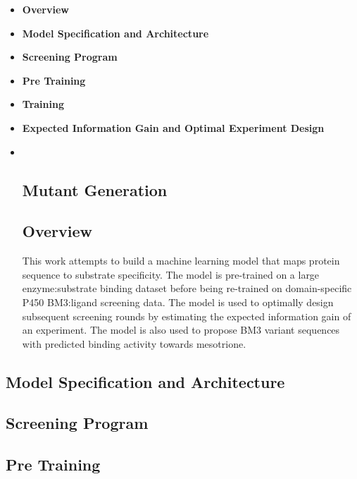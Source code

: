 \begin{itemize}
\item
  \textbf{Overview}
\item
  \textbf{Model Specification and Architecture}
\item
  \textbf{Screening Program}
\item
  \textbf{Pre Training}
\item
  \textbf{Training}
\item
  \textbf{Expected Information Gain and Optimal Experiment Design}
\item ~
  \hypertarget{mutant-generation}{%
  \subsection{\texorpdfstring{\textbf{Mutant
  Generation}}{Mutant Generation}}\label{mutant-generation}}

  \hypertarget{overview-9}{%
  \subsection{Overview}\label{overview-9}}

  This work attempts to build a machine learning model that maps protein
  sequence to substrate specificity. The model is pre-trained on a large
  enzyme:substrate binding dataset before being re-trained on
  domain-specific P450 BM3:ligand screening data. The model is used to
  optimally design subsequent screening rounds by estimating the
  expected information gain of an experiment. The model is also used to
  propose BM3 variant sequences with predicted binding activity towards
  mesotrione.
\end{itemize}

\hypertarget{model-specification-and-architecture}{%
\subsection{Model Specification and
Architecture}\label{model-specification-and-architecture}}

\hypertarget{screening-program-1}{%
\subsection{Screening Program}\label{screening-program-1}}

\hypertarget{pre-training}{%
\subsection{Pre Training}\label{pre-training}}

